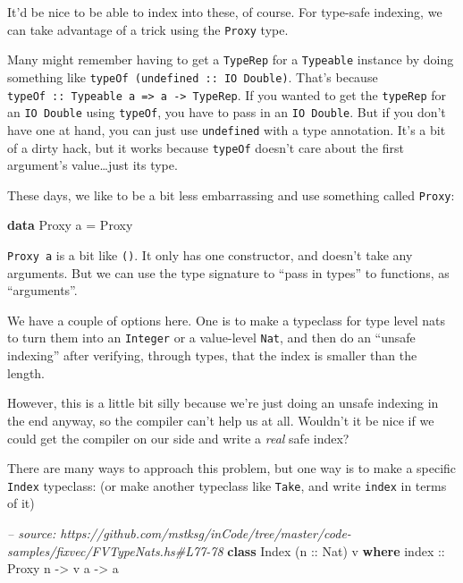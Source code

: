 \documentclass[]{article}
\newenvironment{Shaded}{}{}
\newcommand{\KeywordTok}[1]{\textcolor[rgb]{0.00,0.44,0.13}{\textbf{#1}}}
\newcommand{\DataTypeTok}[1]{\textcolor[rgb]{0.56,0.13,0.00}{#1}}
\newcommand{\CommentTok}[1]{\textcolor[rgb]{0.38,0.63,0.69}{\textit{#1}}}
\newcommand{\OtherTok}[1]{\textcolor[rgb]{0.00,0.44,0.13}{#1}}
\newcommand{\FunctionTok}[1]{\textcolor[rgb]{0.02,0.16,0.49}{#1}}
\newcommand{\NormalTok}[1]{#1}
\begin{document}
It'd be nice to be able to index into these, of course. For type-safe indexing,
we can take advantage of a trick using the \texttt{Proxy} type.

Many might remember having to get a \texttt{TypeRep} for a \texttt{Typeable}
instance by doing something like \texttt{typeOf\ (undefined\ ::\ IO\ Double)}.
That's because
\texttt{typeOf\ ::\ Typeable\ a\ =\textgreater{}\ a\ -\textgreater{}\ TypeRep}.
If you wanted to get the \texttt{typeRep} for an \texttt{IO\ Double} using
\texttt{typeOf}, you have to pass in an \texttt{IO\ Double}. But if you don't
have one at hand, you can just use \texttt{undefined} with a type annotation.
It's a bit of a dirty hack, but it works because \texttt{typeOf} doesn't care
about the first argument's value\ldots{}just its type.

These days, we like to be a bit less embarrassing and use something called
\texttt{Proxy}:

\begin{Shaded}
\begin{Highlighting}[]
\KeywordTok{data} \DataTypeTok{Proxy}\NormalTok{ a }\FunctionTok{=} \DataTypeTok{Proxy}
\end{Highlighting}
\end{Shaded}

\texttt{Proxy\ a} is a bit like \texttt{()}. It only has one constructor, and
doesn't take any arguments. But we can use the type signature to ``pass in
types'' to functions, as ``arguments''.

We have a couple of options here. One is to make a typeclass for type level nats
to turn them into an \texttt{Integer} or a value-level \texttt{Nat}, and then do
an ``unsafe indexing'' after verifying, through types, that the index is smaller
than the length.

However, this is a little bit silly because we're just doing an unsafe indexing
in the end anyway, so the compiler can't help us at all. Wouldn't it be nice if
we could get the compiler on our side and write a \emph{real} safe index?

There are many ways to approach this problem, but one way is to make a specific
\texttt{Index} typeclass: (or make another typeclass like \texttt{Take}, and
write \texttt{index} in terms of it)

\begin{Shaded}
\begin{Highlighting}[]
\CommentTok{-- source: https://github.com/mstksg/inCode/tree/master/code-samples/fixvec/FVTypeNats.hs#L77-78}
\KeywordTok{class} \DataTypeTok{Index}\NormalTok{ (}\OtherTok{n ::} \DataTypeTok{Nat}\NormalTok{) v }\KeywordTok{where}
\OtherTok{    index ::} \DataTypeTok{Proxy}\NormalTok{ n }\OtherTok{->}\NormalTok{ v a }\OtherTok{->}\NormalTok{ a}
\end{Highlighting}
\end{Shaded}
\end{document}
